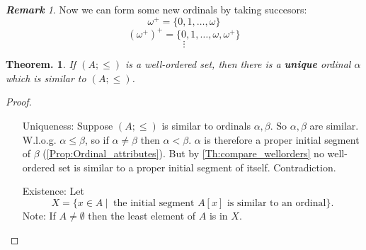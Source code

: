 \documentclass[a4paper,oneside,11pt,DIV=12,parskip=half]{scrartcl}
\theoremstyle{plain}
\newtheorem{theorem}{Theorem.}[section]
\theoremstyle{definition}
\newtheorem{remark, definition}[theorem]{Remark and Definition.}
\newtheorem{lemma, definition}[theorem]{Lemma and Definition.}
\newtheorem{theorem, definition}[theorem]{Theorem and Definition.}
\theoremstyle{remark}
\newtheorem*{remark}{\textbf{Remark}}
\newtheorem*{remark, example}{\textbf{Remark and Exercise}}
\begin{document}
\begin{remark}

Now we can form some new ordinals by taking succesors:
\[ \omega ^+ = \{ 0,1, \dots, \omega \} \]
\[ (\omega^+)^+ = \{ 0,1,\dots,\omega,\omega^+ \} \]
\[ \vdots \]

\end{remark}

\begin{theorem}
If $(A;\leq)$ is a well-ordered set, then there is a \textbf{unique} ordinal $\alpha$ which is similar to $(A;\leq)$.
\end{theorem}

\begin{proof}
\begin{itemize}
    \item[Uniqueness:]  Suppose $(A;\leq)$ is similar to ordinals $\alpha,\beta$. So $\alpha,\beta$ are similar. W.l.o.g. $\alpha \leq \beta$, so if $\alpha \neq \beta$ then $\alpha < \beta$. $\alpha$ is therefore a proper initial segment of $\beta$ (\ref{Prop:Ordinal_attributes}). But by \ref{Th:compare_wellorders} no well-ordered set is similar to a proper initial segment of itself. Contradiction.
    \item[Existence:] Let
    \[ X = \{ x \in A ~|~ \text{ the initial segment $A[x]$ is similar to an ordinal} \}. \]
    Note: If $A \neq \emptyset$ then the least element of $A$ is in $X$.
\end{itemize}
\end{proof}
\end{document}
